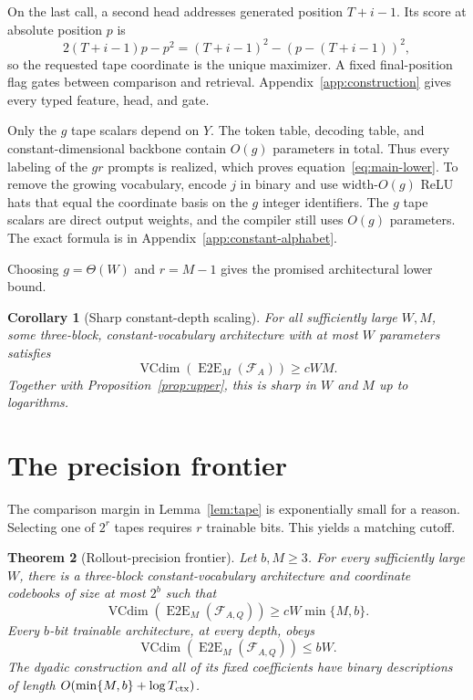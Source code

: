 \documentclass{article}
\newtheorem{theorem}{Theorem}
\newtheorem{corollary}[theorem]{Corollary}
\newcommand{\1}{\mathbf 1}
\newcommand{\VC}{\operatorname{VCdim}}
\newcommand{\EtoE}{\operatorname{E2E}}
\begin{document}
On the last call, a second head addresses generated position $T+i-1$. Its score at absolute
position $p$ is
\begin{equation}
 2(T+i-1)p-p^2=(T+i-1)^2-(p-(T+i-1))^2,
 \label{eq:address-score}
\end{equation}
so the requested tape coordinate is the unique maximizer. A fixed final-position flag gates
between comparison and retrieval. Appendix~\ref{app:construction} gives every typed feature,
head, and gate.

Only the $g$ tape scalars depend on $Y$. The token table, decoding table, and constant-dimensional
backbone contain $O(g)$ parameters in total. Thus every labeling of the $gr$ prompts is realized,
which proves equation~\eqref{eq:main-lower}. To remove the growing vocabulary, encode $j$ in
binary and use width-$O(g)$ ReLU hats that equal the coordinate basis on the $g$ integer
identifiers. The $g$ tape scalars are direct output weights, and the compiler still uses $O(g)$
parameters. The exact formula is in Appendix~\ref{app:constant-alphabet}.

Choosing $g=\Theta(W)$ and $r=M-1$ gives the promised architectural lower bound.

\begin{corollary}[Sharp constant-depth scaling]\label{cor:sharp}
For all sufficiently large $W,M$, some three-block, constant-vocabulary architecture with at most
$W$ parameters satisfies
\[
 \VC(\EtoE_M(\mathcal F_A))\geq cWM.
\]
Together with Proposition~\ref{prop:upper}, this is sharp in $W$ and $M$ up to logarithms.
\end{corollary}

\section{The precision frontier}

The comparison margin in Lemma~\ref{lem:tape} is exponentially small for a reason. Selecting one
of $2^r$ tapes requires $r$ trainable bits. This yields a matching cutoff.

\begin{theorem}[Rollout-precision frontier]\label{thm:precision}
Let $b,M\geq3$. For every sufficiently large $W$, there is a three-block constant-vocabulary
architecture and coordinate codebooks of size at most $2^b$ such that
\begin{equation}
 \VC(\EtoE_M(\mathcal F_{A,Q}))
 \geq cW\min\{M,b\}.
 \label{eq:precision-lower}
\end{equation}
Every $b$-bit trainable architecture, at every depth, obeys
\begin{equation}
 \VC(\EtoE_M(\mathcal F_{A,Q}))\leq bW.
 \label{eq:precision-upper}
\end{equation}
The dyadic construction and all of its fixed coefficients have binary descriptions of length
$O(\min\{M,b\}+\log T_{\rm ctx})$.
\end{theorem}
\end{document}
